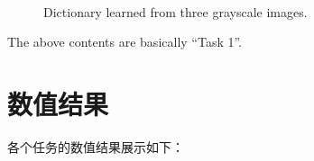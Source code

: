 \documentclass[a4paper,11pt]{article}
\begin{document}
\begin{figure}[H]
	\centering
	  \\ 
	\caption{Dictionary learned from three grayscale images.}
	\label{fig:dl_gray}
\end{figure}

\begin{remark}
	The above contents are basically ``Task 1''.
\end{remark}

\section{数值结果}

各个任务的数值结果展示如下：
\end{document}
